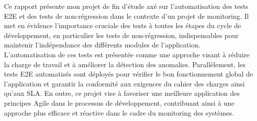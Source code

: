 \begin{resume}
Ce rapport présente mon projet de fin d’étude axé sur l’automatisation des tests E2E et des tests de non-régression dans le contexte d’un projet de monitoring. Il met en évidence l’importance cruciale des tests à toutes les étapes du cycle de développement, en particulier les tests de non-régression, indispensables pour maintenir l’indépendance des différents modules de l’application. L’automatisation de ces tests est présentée comme une approche visant à réduire la charge de travail et à améliorer la détection des anomalies. Parallèlement, les tests E2E automatisés sont déployés pour vérifier le bon fonctionnement global de l’application et garantir la conformité aux exigences du cahier des charges ainsi qu’aux SLA. En outre, ce projet vise à favoriser une meilleure application des principes Agile dans le processus de développement, contribuant ainsi à une approche plus efficace et réactive dans le cadre du monitoring des systèmes.
\end{resume}